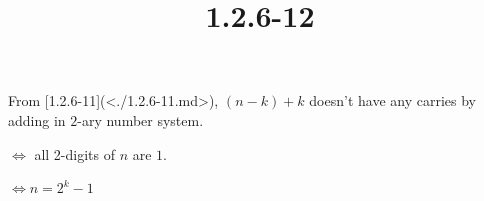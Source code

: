 \documentclass{article}
\title{1.2.6-12}
\begin{document}
\maketitle

From [1.2.6-11](<./1.2.6-11.md>), $(n-k) + k$ doesn't have any carries by adding in $2$-ary number system.

$\iff$ all 2-digits of $n$ are $1$.

$\iff n = 2^k - 1$
\end{document}
